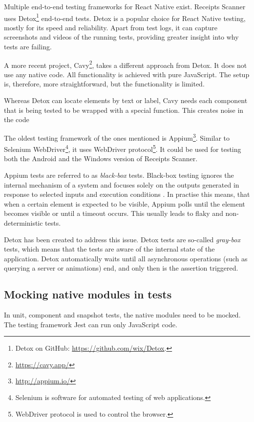 \documentclass[
  digital, %
  table,   %
  oneside, %
  lof,     %
  lot,     %
]{fithesis3}
\begin{document}
Multiple end-to-end testing frameworks for React Native exist. Receipts Scanner uses Detox\footnote{Detox on GitHub: \url{https://github.com/wix/Detox}.} end-to-end tests. Detox is a popular choice for React Native testing, mostly for its speed and reliability. Apart from test logs, it can capture screenshots and videos of the running tests, providing greater insight into why tests are failing.

A more recent project, Cavy\footnote{\url{https://cavy.app/}}, takes a different approach from Detox. It does not use any native code. All functionality is achieved with pure JavaScript. The setup is, therefore, more straightforward, but the functionality is limited.

Whereas Detox can locate elements by text or label, Cavy needs each component that is being tested to be wrapped with a special function. This creates noise in the code

The oldest testing framework of the ones mentioned is Appium\footnote{\url{http://appium.io/}}. Similar to Selenium WebDriver\footnote{Selenium is software for automated testing of web applications.}, it uses WebDriver protocol\footnote{WebDriver protocol is used to control the browser.}. It could be used for testing both the Android and the Windows version of Receipts Scanner.

Appium tests are referred to as \textit{black-box} tests. Black-box testing ignores the internal mechanism of a system and focuses solely on the outputs generated in response to selected inputs and execution conditions \cite{Gao2003Testing}. In practise this means, that when a certain element is expected to be visible, Appium polls until the element becomes visible or until a timeout occurs. This usually leads to flaky and non-deterministic tests.

Detox has been created to address this issue. Detox tests are so-called \textit{gray-box} tests, which means that the tests are aware of the internal state of the application. Detox automatically waits until all asynchronous operations (such as querying a server or animations) end, and only then is the assertion triggered.

\subsection{Mocking native modules in tests}
In unit, component and snapshot tests, the native modules need to be mocked. The testing framework Jest can run only JavaScript code.
\end{document}
